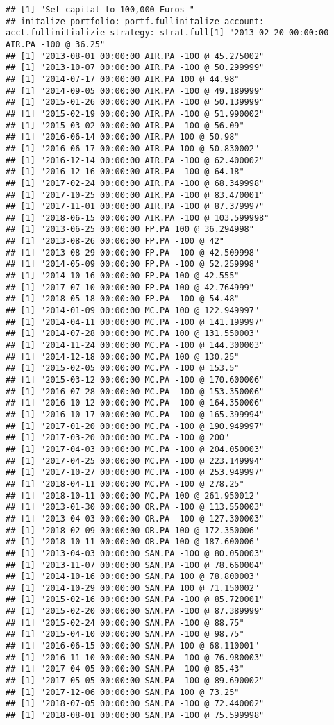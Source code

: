 \documentclass[
  11pt,
]{article}
\begin{document}
\begin{verbatim}
## [1] "Set capital to 100,000 Euros "
## initalize portfolio: portf.fullinitalize account: acct.fullinitializie strategy: strat.full[1] "2013-02-20 00:00:00 AIR.PA -100 @ 36.25"
## [1] "2013-08-01 00:00:00 AIR.PA -100 @ 45.275002"
## [1] "2013-10-07 00:00:00 AIR.PA -100 @ 50.299999"
## [1] "2014-07-17 00:00:00 AIR.PA 100 @ 44.98"
## [1] "2014-09-05 00:00:00 AIR.PA -100 @ 49.189999"
## [1] "2015-01-26 00:00:00 AIR.PA -100 @ 50.139999"
## [1] "2015-02-19 00:00:00 AIR.PA -100 @ 51.990002"
## [1] "2015-03-02 00:00:00 AIR.PA -100 @ 56.09"
## [1] "2016-06-14 00:00:00 AIR.PA 100 @ 50.98"
## [1] "2016-06-17 00:00:00 AIR.PA 100 @ 50.830002"
## [1] "2016-12-14 00:00:00 AIR.PA -100 @ 62.400002"
## [1] "2016-12-16 00:00:00 AIR.PA -100 @ 64.18"
## [1] "2017-02-24 00:00:00 AIR.PA -100 @ 68.349998"
## [1] "2017-10-25 00:00:00 AIR.PA -100 @ 83.470001"
## [1] "2017-11-01 00:00:00 AIR.PA -100 @ 87.379997"
## [1] "2018-06-15 00:00:00 AIR.PA -100 @ 103.599998"
## [1] "2013-06-25 00:00:00 FP.PA 100 @ 36.294998"
## [1] "2013-08-26 00:00:00 FP.PA -100 @ 42"
## [1] "2013-08-29 00:00:00 FP.PA -100 @ 42.509998"
## [1] "2014-05-09 00:00:00 FP.PA -100 @ 52.259998"
## [1] "2014-10-16 00:00:00 FP.PA 100 @ 42.555"
## [1] "2017-07-10 00:00:00 FP.PA 100 @ 42.764999"
## [1] "2018-05-18 00:00:00 FP.PA -100 @ 54.48"
## [1] "2014-01-09 00:00:00 MC.PA 100 @ 122.949997"
## [1] "2014-04-11 00:00:00 MC.PA -100 @ 141.199997"
## [1] "2014-07-28 00:00:00 MC.PA 100 @ 131.550003"
## [1] "2014-11-24 00:00:00 MC.PA -100 @ 144.300003"
## [1] "2014-12-18 00:00:00 MC.PA 100 @ 130.25"
## [1] "2015-02-05 00:00:00 MC.PA -100 @ 153.5"
## [1] "2015-03-12 00:00:00 MC.PA -100 @ 170.600006"
## [1] "2016-07-28 00:00:00 MC.PA -100 @ 153.350006"
## [1] "2016-10-12 00:00:00 MC.PA -100 @ 164.350006"
## [1] "2016-10-17 00:00:00 MC.PA -100 @ 165.399994"
## [1] "2017-01-20 00:00:00 MC.PA -100 @ 190.949997"
## [1] "2017-03-20 00:00:00 MC.PA -100 @ 200"
## [1] "2017-04-03 00:00:00 MC.PA -100 @ 204.050003"
## [1] "2017-04-25 00:00:00 MC.PA -100 @ 223.149994"
## [1] "2017-10-27 00:00:00 MC.PA -100 @ 253.949997"
## [1] "2018-04-11 00:00:00 MC.PA -100 @ 278.25"
## [1] "2018-10-11 00:00:00 MC.PA 100 @ 261.950012"
## [1] "2013-01-30 00:00:00 OR.PA -100 @ 113.550003"
## [1] "2013-04-03 00:00:00 OR.PA -100 @ 127.300003"
## [1] "2018-02-09 00:00:00 OR.PA 100 @ 172.350006"
## [1] "2018-10-11 00:00:00 OR.PA 100 @ 187.600006"
## [1] "2013-04-03 00:00:00 SAN.PA -100 @ 80.050003"
## [1] "2013-11-07 00:00:00 SAN.PA -100 @ 78.660004"
## [1] "2014-10-16 00:00:00 SAN.PA 100 @ 78.800003"
## [1] "2014-10-29 00:00:00 SAN.PA 100 @ 71.150002"
## [1] "2015-02-16 00:00:00 SAN.PA -100 @ 85.720001"
## [1] "2015-02-20 00:00:00 SAN.PA -100 @ 87.389999"
## [1] "2015-02-24 00:00:00 SAN.PA -100 @ 88.75"
## [1] "2015-04-10 00:00:00 SAN.PA -100 @ 98.75"
## [1] "2016-06-15 00:00:00 SAN.PA 100 @ 68.110001"
## [1] "2016-11-10 00:00:00 SAN.PA -100 @ 76.980003"
## [1] "2017-04-05 00:00:00 SAN.PA -100 @ 85.43"
## [1] "2017-05-05 00:00:00 SAN.PA -100 @ 89.690002"
## [1] "2017-12-06 00:00:00 SAN.PA 100 @ 73.25"
## [1] "2018-07-05 00:00:00 SAN.PA -100 @ 72.440002"
## [1] "2018-08-01 00:00:00 SAN.PA -100 @ 75.599998"
\end{verbatim}
\end{document}
